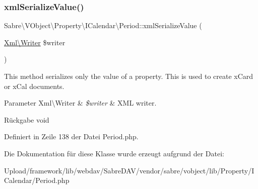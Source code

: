 \mbox{\label{class_sabre_1_1_v_object_1_1_property_1_1_i_calendar_1_1_period_adcafc98b0a9cf5f4cf298c5948a3ba50}} 
\subsubsection{\texorpdfstring{xml\+Serialize\+Value()}{xmlSerializeValue()}}
{\footnotesize\ttfamily Sabre\textbackslash{}\+V\+Object\textbackslash{}\+Property\textbackslash{}\+I\+Calendar\textbackslash{}\+Period\+::xml\+Serialize\+Value (\begin{DoxyParamCaption}\item[{\mbox{\hyperlink{class_sabre_1_1_xml_1_1_writer}{Xml\textbackslash{}\+Writer}}}]{\$writer }\end{DoxyParamCaption})\hspace{0.3cm}{\ttfamily [protected]}}

This method serializes only the value of a property. This is used to create x\+Card or x\+Cal documents.


\begin{DoxyParams}[1]{Parameter}
Xml\textbackslash{}\+Writer & {\em \$writer} & X\+ML writer.\\
\hline
\end{DoxyParams}
\begin{DoxyReturn}{Rückgabe}
void 
\end{DoxyReturn}


Definiert in Zeile 138 der Datei Period.\+php.



Die Dokumentation für diese Klasse wurde erzeugt aufgrund der Datei\+:\begin{DoxyCompactItemize}
\item 
Upload/framework/lib/webdav/\+Sabre\+D\+A\+V/vendor/sabre/vobject/lib/\+Property/\+I\+Calendar/Period.\+php\end{DoxyCompactItemize}
